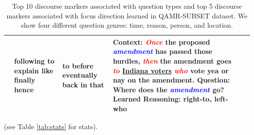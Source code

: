 \begin{table}[t]
{\begin{tabular}{|p{2cm}|p{4cm}|p{1.5cm}|p{1.5cm}|p{6cm}|}
	 & following \newline to explain \newline like \newline finally \newline hence & to \newline before \newline eventually \newline back \newline in that
  & \textbf{Context: }\textit{\textcolor{red}{Once}} the proposed \textit{\textcolor{blue}{amendment}} has passed those hurdles, \textit{\textcolor{red}{then}} the amendment goes \textit{\textcolor{red}{to}} \underline{Indiana voters} \textit{\textcolor{red}{who}} vote yea or nay on the amendment. 
  \newline \textbf{Question: }Where does the \textit{\textcolor{blue}{amendment}} go?
  \newline \textbf{Learned Reasoning: }right-to, left-who\\ 
 \hline
\end{tabular}
}
\caption{\fontsize{9}{12}\selectfont Top 10 discourse markers associated with question types and top 5 discourse markers associated with focus direction learned in \textsc{QAMR-SUBSET} dataset. We show four different question genres: time, reason, person, and location.}
\label{tab:disc_phrase}
\vspace{-0.5em}
\end{table}


(see Table \ref{tab:stats} for stats).
\begin{table}[h]
\caption{\fontsize{10}{12}\selectfont  Statistics of the datasets.}\label{tab:stats}
\end{table}
